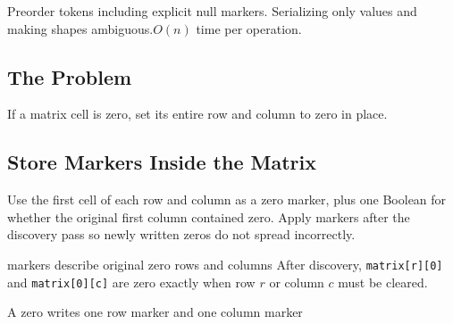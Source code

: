  {Preorder tokens including explicit null markers.}
  {Serializing only values and making shapes ambiguous.}{$O(n)$ time per operation.}



\subsection{The Problem}
If a matrix cell is zero, set its entire row and column to zero in place.

\subsection{Store Markers Inside the Matrix}
Use the first cell of each row and column as a zero marker, plus one Boolean
for whether the original first column contained zero. Apply markers after the
discovery pass so newly written zeros do not spread incorrectly.

\begin{invariantbox}{markers describe original zero rows and columns}
After discovery, \texttt{matrix[r][0]} and \texttt{matrix[0][c]} are zero
exactly when row \(r\) or column \(c\) must be cleared.
\end{invariantbox}

\begin{visualbox}{A zero writes one row marker and one column marker}
\centering
{}
\end{visualbox}

